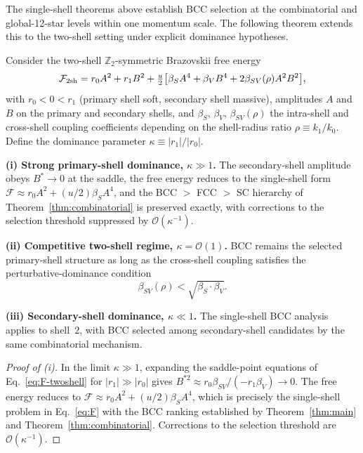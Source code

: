 The single-shell theorems above establish BCC selection at the
combinatorial and global-12-star levels within one momentum scale.
The following theorem extends this to the two-shell setting under
explicit dominance hypotheses.

\begin{theorem}
\label{thm:multishell}
Consider the two-shell $\mathbb{Z}_2$-symmetric Brazovskii free energy
\begin{equation}
\mathcal{F}_{2{\rm sh}} = r_0 A^2 + r_1 B^2 + \tfrac{u}{2}\big[
\beta_S A^4 + \beta_V B^4 + 2 \beta_{SV}(\rho) A^2 B^2 \big],
\label{eq:F-twoshell}
\end{equation}
with $r_0 < 0 < r_1$ (primary shell soft, secondary shell massive),
amplitudes $A$ and $B$ on the primary and secondary shells, and
$\beta_S$, $\beta_V$, $\beta_{SV}(\rho)$ the intra-shell and
cross-shell coupling coefficients depending on the shell-radius ratio
$\rho \equiv k_1/k_0$. Define the dominance parameter
$\kappa \equiv |r_1|/|r_0|$.

\textbf{(i) Strong primary-shell dominance, $\kappa \gg 1$.}
The secondary-shell amplitude obeys $B^* \to 0$ at the saddle, the
free energy reduces to the single-shell form
$\mathcal{F} \approx r_0 A^2 + (u/2) \beta_S A^4$, and the BCC $>$
FCC $>$ SC hierarchy of Theorem~\ref{thm:combinatorial} is preserved
exactly, with corrections to the selection threshold suppressed by
$\mathcal{O}(\kappa^{-1})$.

\textbf{(ii) Competitive two-shell regime, $\kappa = \mathcal{O}(1)$.}
BCC remains the selected primary-shell structure as long as the
cross-shell coupling satisfies the perturbative-dominance condition
\begin{equation}
\beta_{SV}(\rho) < \sqrt{\beta_S \cdot \beta_V}.
\label{eq:PD}
\end{equation}

\textbf{(iii) Secondary-shell dominance, $\kappa \ll 1$.}
The single-shell BCC analysis applies to shell~$2$, with BCC selected
among secondary-shell candidates by the same combinatorial mechanism.
\end{theorem}

\begin{proof}[Proof of (i)]
In the limit $\kappa \gg 1$, expanding the saddle-point equations of
Eq.~\eqref{eq:F-twoshell} for $|r_1| \gg |r_0|$ gives
$B^{*2} \approx r_0 \beta_{SV} / (-r_1 \beta_V) \to 0$. The free
energy reduces to $\mathcal{F} \approx r_0 A^2 + (u/2) \beta_S A^4$,
which is precisely the single-shell problem in Eq.~\eqref{eq:F} with
the BCC ranking established by Theorem~\ref{thm:main} and
Theorem~\ref{thm:combinatorial}. Corrections to the selection
threshold are $\mathcal{O}(\kappa^{-1})$.
\end{proof}

